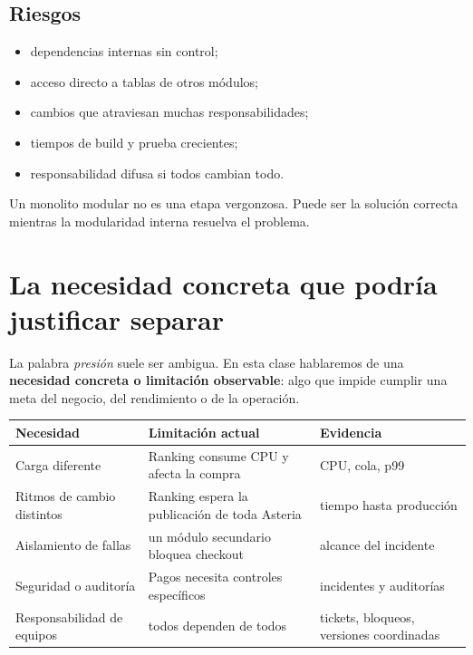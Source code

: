 \documentclass[variant=apuntes,cover=institutional,mode=screen]{ua-engineering-v6-article}
\begin{document}
\subsection{Riesgos}

\begin{itemize}
\item dependencias internas sin control;
\item acceso directo a tablas de otros módulos;
\item cambios que atraviesan muchas responsabilidades;
\item tiempos de build y prueba crecientes;
\item responsabilidad difusa si todos cambian todo.
\end{itemize}

Un monolito modular no es una etapa vergonzosa. Puede ser la solución correcta mientras la modularidad interna resuelva el problema.

\section{La necesidad concreta que podría justificar separar}

La palabra \emph{presión} suele ser ambigua. En esta clase hablaremos de una \textbf{necesidad concreta o limitación observable}: algo que impide cumplir una meta del negocio, del rendimiento o de la operación.

\begin{center}
\begin{tabular}{p{}p{}p{}}
\toprule
\textbf{Necesidad} & \textbf{Limitación actual} & \textbf{Evidencia} \\
\midrule
Carga diferente & Ranking consume CPU y afecta la compra & CPU, cola, p99 \\
Ritmos de cambio distintos & Ranking espera la publicación de toda Asteria & tiempo hasta producción \\
Aislamiento de fallas & un módulo secundario bloquea checkout & alcance del incidente \\
Seguridad o auditoría & Pagos necesita controles específicos & incidentes y auditorías \\
Responsabilidad de equipos & todos dependen de todos & tickets, bloqueos, versiones coordinadas \\
\bottomrule
\end{tabular}
\end{center}
\end{document}

